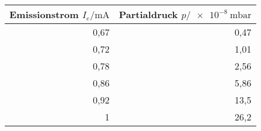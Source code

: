 \begin{tabular}{rr}
\toprule
Emissionstrom $I_{e}/\si{\milli\ampere}$ & Partialdruck $p/\SI{e-8}{\milli\bar}$ \\
\midrule
0,67	& 0,47 \\
0,72	& 1,01 \\
0,78	& 2,56 \\
0,86	& 5,86	\\
0,92	& 13,5	\\
1       & 26,2\\
\bottomrule
\end{tabular}

